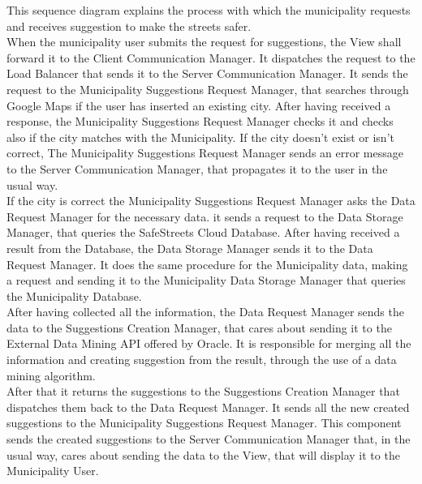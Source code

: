 \documentclass[titlepage]{article}
\begin{document}
This sequence diagram explains the process with which the municipality requests and receives suggestion to make the streets safer. \\
When the municipality user submits the request for suggestions, the View shall forward it to the Client Communication Manager. It dispatches the request to the Load Balancer that sends it to the Server Communication Manager. It sends the request to the Municipality Suggestions Request Manager, that searches through Google Maps if the user has inserted an existing city. After having received a response, the Municipality Suggestions Request Manager checks it and checks also if the city matches with the Municipality. If the city doesn't exist or isn't correct, The Municipality Suggestions Request Manager sends an error message to the Server Communication Manager, that propagates it to the user in the usual way.\\
If the city is correct the Municipality Suggestions Request Manager asks the Data Request Manager for the necessary data. it sends a request to the Data Storage Manager, that queries the SafeStreets Cloud Database. After having received a result from the Database, the Data Storage Manager sends it to the Data Request Manager. It does the same procedure for the Municipality data, making a request and sending it to the Municipality Data Storage Manager that queries the Municipality Database.\\
After having collected all the information, the Data Request Manager sends the data to the Suggestions Creation Manager, that cares about sending it to the External Data Mining API offered by Oracle. It is responsible for merging all the information and creating suggestion from the result, through the use of a data mining algorithm. \\
After that it returns the suggestions to the Suggestions Creation Manager that dispatches them back to the Data Request Manager. It sends all the new created suggestions to the Municipality Suggestions Request Manager. This component sends the created suggestions to the Server Communication Manager that, in the usual way, cares about sending the data to the View, that will display it to the Municipality User.
\newpage
\end{document}
